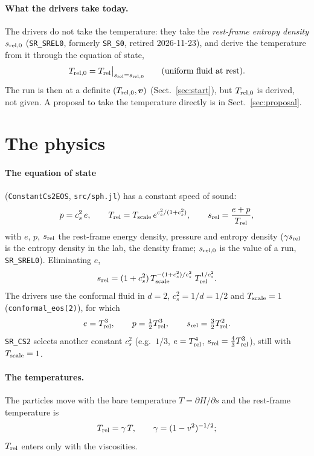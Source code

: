 \documentclass[11pt,aps,preprint,nofootinbib,superscriptaddress,tightenlines]{revtex4-2}
\def\st{\begin{equation}}
\def\stp{\end{equation}}
\def\Sect#1{Sect.~\ref{#1}}
\let\oldparagraph\paragraph
\renewcommand{\paragraph}{\par\bigskip\oldparagraph}
\begin{document}
\paragraph{What the drivers take today.}  The drivers do not take the temperature: they take the \emph{rest-frame entropy density} $s_{\rm rel,0}$
(\texttt{SR\_SREL0}, formerly \texttt{SR\_S0}, retired 2026-11-23), and derive the temperature from it through the equation of state,
\st
T_{\rm rel,0}=T_{\rm rel}\big|_{s_{\rm rel}=s_{\rm rel,0}}\qquad\text{(uniform fluid at rest)} .
\label{eq:Trel0}
\stp
The run is then at a definite $(T_{\rm rel,0},\bm v)$ (\Sect{sec:start}), but $T_{\rm rel,0}$ is derived, not given.  A proposal to take
the temperature directly is in \Sect{sec:proposal}.

\section{The physics}
\label{sec:physics}

\paragraph{The equation of state} (\texttt{ConstantCs2EOS}, \texttt{src/sph.jl}) has a constant speed of sound:
\st
p=c_s^2\,e,\qquad T_{\rm rel}=T_{\rm scale}\,e^{c_s^2/(1+c_s^2)},\qquad s_{\rm rel}=\frac{e+p}{T_{\rm rel}} ,
\label{eq:eos}
\stp
with $e$, $p$, $s_{\rm rel}$ the rest-frame energy density, pressure and entropy density ($\gamma s_{\rm rel}$ is the entropy density in the lab, the density frame; $s_{\rm rel,0}$ is the value of a run, \texttt{SR\_SREL0}).  Eliminating $e$,
\st
s_{\rm rel}=(1+c_s^2)\,T_{\rm scale}^{-(1+c_s^2)/c_s^2}\;T_{\rm rel}^{1/c_s^2} .
\label{eq:sofT}
\stp
The drivers use the conformal fluid in $d=2$, $c_s^2=1/d=1/2$ and $T_{\rm scale}=1$ (\texttt{conformal\_eos(2)}), for which
\st
e=T_{\rm rel}^3,\qquad p=\tfrac12T_{\rm rel}^3,\qquad s_{\rm rel}=\tfrac32T_{\rm rel}^2 .
\label{eq:conformal}
\stp
\texttt{SR\_CS2} selects another constant $c_s^2$ (e.g.\ $1/3$, $e=T_{\rm rel}^4$, $s_{\rm rel}=\tfrac43T_{\rm rel}^3$), still with $T_{\rm scale}=1$.

\paragraph{The temperatures.}  The particles move with the bare temperature $T=\partial H/\partial s$ and the rest-frame temperature is
\st
T_{\rm rel}=\gamma\,T ,\qquad \gamma=(1-v^2)^{-1/2};
\stp
$T_{\rm rel}$ enters only with the viscosities.
\end{document}
